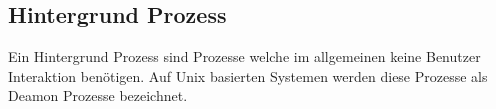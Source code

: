 \subsection{Hintergrund Prozess}

Ein Hintergrund Prozess sind Prozesse welche im allgemeinen keine Benutzer Interaktion benötigen. Auf Unix basierten Systemen werden diese Prozesse als Deamon Prozesse bezeichnet. 
